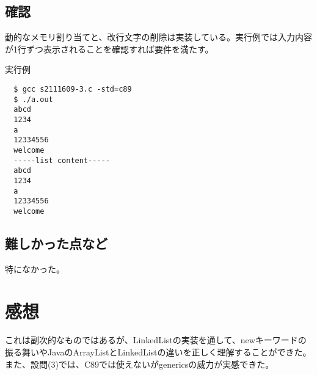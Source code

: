 \documentclass[dvipdfmx,12pt,a4j]{jarticle}
\begin{document}
\subsection{確認}
動的なメモリ割り当てと、改行文字の削除は実装している。実行例では入力内容が1行ずつ表示されることを確認すれば要件を満たす。



\begin{itembox}[l]{実行例}
\begin{verbatim}
  $ gcc s2111609-3.c -std=c89
  $ ./a.out
  abcd
  1234
  a
  12334556
  welcome
  -----list content-----
  abcd
  1234
  a
  12334556
  welcome
\end{verbatim}
\end{itembox}

\subsection{難しかった点など}
特になかった。

\section{感想}
これは副次的なものではあるが、LinkedListの実装を通して、newキーワードの振る舞いやJavaのArrayListとLinkedListの違いを正しく理解することができた。また、設問(3)では、C89では使えないがgenericsの威力が実感できた。





\end{document}
